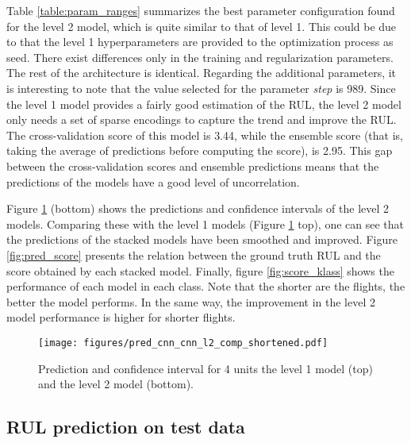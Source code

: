 \documentclass[PHM, 2021]{PHMSociety}
\begin{document}
Table \ref{table:param_ranges} summarizes the best parameter configuration found for the level 2 model, which is quite similar to that of level 1. This could be due to that the level 1 hyperparameters are provided to the optimization process as seed. There exist differences only in the training and regularization parameters. The rest of the architecture is identical. Regarding the additional parameters, it is interesting to note that the value selected for the parameter \textit{step} is 989. Since the level 1 model provides a fairly good estimation of the RUL, the level 2 model only needs a set of sparse encodings to capture the trend and improve the RUL. The cross-validation score of this model is 3.44, while the ensemble score (that is, taking the average of predictions before computing the score), is 2.95. This gap between the cross-validation scores and ensemble predictions means that the predictions of the models have a good level of uncorrelation.

Figure \ref{fig:predl2} (bottom) shows the predictions and confidence intervals of the level 2 models. Comparing these with the level 1 models (Figure \ref{fig:predl2} top), one can see that the predictions of the stacked models have been smoothed and improved. Figure \ref{fig:pred_score} presents the relation between the ground truth RUL and the score obtained by each stacked model. Finally, figure \ref{fig:score_klass} shows the performance of each  model in each class. Note that the shorter are the flights, the better the model performs. In the same way, the improvement in the level 2 model performance is higher for shorter flights.

\begin{figure}[t]
\centering
\texttt{[image: figures/pred\_cnn\_cnn\_l2\_comp\_shortened.pdf]}
\caption{Prediction and confidence interval for 4 units the level 1 model (top) and the level 2 model (bottom).}
\label{fig:predl2}
\end{figure}

\subsection{RUL prediction on test data}
\end{document}
